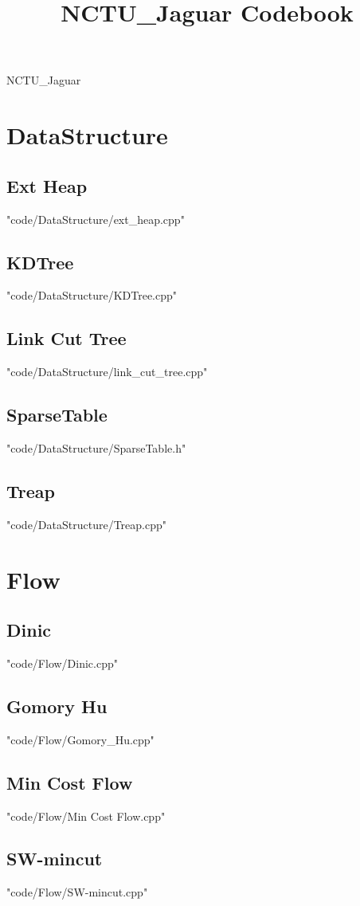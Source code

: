 \documentclass[landscape, 8pt,twocolumn,oneside, a4paper]{article}
\title {NCTU\_Jaguar Codebook}
\begin{document}
\thispagestyle{fancy}
{ \Huge NCTU\_Jaguar}
\tableofcontents

\section{DataStructure}
\subsection{Ext Heap}
 {"code/DataStructure/ext_heap.cpp"}
\subsection{KDTree}
 {"code/DataStructure/KDTree.cpp"}
\subsection{Link Cut Tree}
 {"code/DataStructure/link_cut_tree.cpp"}
\subsection{SparseTable}
 {"code/DataStructure/SparseTable.h"}
\subsection{Treap}
 {"code/DataStructure/Treap.cpp"}
\section{Flow}
\subsection{Dinic}
 {"code/Flow/Dinic.cpp"}
\subsection{Gomory Hu}
 {"code/Flow/Gomory_Hu.cpp"}
\subsection{Min Cost Flow}
 {"code/Flow/Min Cost Flow.cpp"}
\subsection{SW-mincut}
 {"code/Flow/SW-mincut.cpp"}
\end{document}
